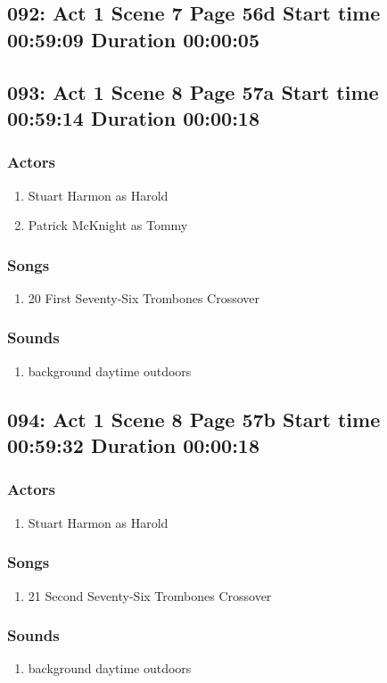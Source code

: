 \subsection{092: Act 1 Scene 7 Page 56d Start time 00:59:09 Duration 00:00:05}

\subsection{093: Act 1 Scene 8 Page 57a Start time 00:59:14 Duration 00:00:18}

\subsubsection{Actors}
\begin{enumerate}
\item Stuart Harmon as Harold
\item Patrick McKnight as Tommy
\end{enumerate}

\subsubsection{Songs}
\begin{enumerate}
\item 20 First Seventy-Six Trombones Crossover
\end{enumerate}\subsubsection{Sounds}
\begin{enumerate}
\item background daytime outdoors
\end{enumerate}
\subsection{094: Act 1 Scene 8 Page 57b Start time 00:59:32 Duration 00:00:18}

\subsubsection{Actors}
\begin{enumerate}
\item Stuart Harmon as Harold
\end{enumerate}

\subsubsection{Songs}
\begin{enumerate}
\item 21 Second Seventy-Six Trombones Crossover
\end{enumerate}\subsubsection{Sounds}
\begin{enumerate}
\item background daytime outdoors
\end{enumerate}
